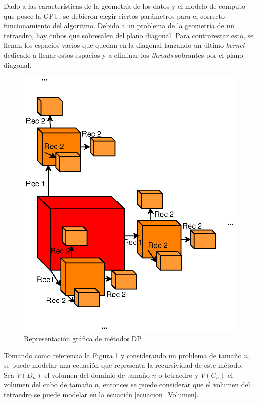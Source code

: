 \documentclass[10pt, conference, compsocconf, onecolumn]{IEEEtran}
\begin{document}
Dado a las caracter\'isticas de la geometr\'ia de los datos y el modelo de computo que posee la GPU, se debieron elegir ciertos par\'ametros para el correcto funcionamiento del algoritmo. Debido a un problema de la geometr\'ia de un tetraedro, hay cubos que sobresalen del plano diagonal. Para contrarestar esto, se llenan los espacios vac\'ios que quedan en la diagonal lanzando un \'ultimo \textit{kernel} dedicado a llenar estos espacios y a eliminar los \textit{threads} sobrantes por el plano diagonal. 
\begin{figure}[H]
	\centering
	\includegraphics[trim = 10mm 80mm 20mm 5mm, clip,scale=0.75]{figures/Diagrama_PD.eps}
	\caption{Representaci\'on gr\'afica de m\'etodos DP}
	\label{fig_diagram_dp}
\end{figure}
Tomando como referencia la Figura \ref{fig_diagram_dp} y considerando un problema de tama\~no $n$, se puede modelar una ecuaci\'on que representa la recursividad de este m\'etodo. Sea $V(D_{n})$ el volumen del dominio de tama\~no $n$ o tetraedro y $V(C_{n})$ el volumen del cubo de tama\~no $n$, entonces se puede considerar que el volumen del tetraedro se puede modelar en la ecuaci\'on \ref{ecuacion_Volumen}.
\end{document}

